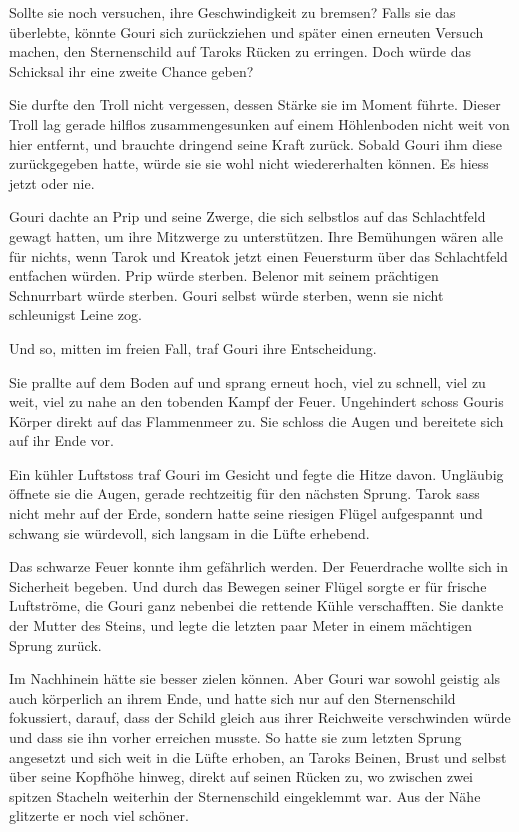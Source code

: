 Sollte sie noch versuchen, ihre Geschwindigkeit zu bremsen? Falls sie das überlebte, könnte Gouri sich zurückziehen und später einen erneuten Versuch machen, den Sternenschild auf Taroks Rücken zu erringen. Doch würde das Schicksal ihr eine zweite Chance geben?

Sie durfte den Troll nicht vergessen, dessen Stärke sie im Moment führte. Dieser Troll lag gerade hilflos zusammengesunken auf einem Höhlenboden nicht weit von hier entfernt, und brauchte dringend seine Kraft zurück. Sobald Gouri ihm diese zurückgegeben hatte, würde sie sie wohl nicht wiedererhalten können. Es hiess jetzt oder nie.

Gouri dachte an Prip und seine Zwerge, die sich selbstlos auf das Schlachtfeld gewagt hatten, um ihre Mitzwerge zu unterstützen. Ihre Bemühungen wären alle für nichts, wenn Tarok und Kreatok jetzt einen Feuersturm über das Schlachtfeld entfachen würden. Prip würde sterben. Belenor mit seinem prächtigen Schnurrbart würde sterben. Gouri selbst würde sterben, wenn sie nicht schleunigst Leine zog.

Und so, mitten im freien Fall, traf Gouri ihre Entscheidung.

Sie prallte auf dem Boden auf und sprang erneut hoch, viel zu schnell, viel zu weit, viel zu nahe an den tobenden Kampf der Feuer. Ungehindert schoss Gouris Körper direkt auf das Flammenmeer zu. Sie schloss die Augen und bereitete sich auf ihr Ende vor.

Ein kühler Luftstoss traf Gouri im Gesicht und fegte die Hitze davon. Ungläubig öffnete sie die Augen, gerade rechtzeitig für den nächsten Sprung. Tarok sass nicht mehr auf der Erde, sondern hatte seine riesigen Flügel aufgespannt und schwang sie würdevoll, sich langsam in die Lüfte erhebend.

Das schwarze Feuer konnte ihm gefährlich werden. Der Feuerdrache wollte sich in Sicherheit begeben. Und durch das Bewegen seiner Flügel sorgte er für frische Luftströme, die Gouri ganz nebenbei die rettende Kühle verschafften. Sie dankte der Mutter des Steins, und legte die letzten paar Meter in einem mächtigen Sprung zurück.

Im Nachhinein hätte sie besser zielen können. Aber Gouri war sowohl geistig als auch körperlich an ihrem Ende, und hatte sich nur auf den Sternenschild fokussiert, darauf, dass der Schild gleich aus ihrer Reichweite verschwinden würde und dass sie ihn vorher erreichen musste. So hatte sie zum letzten Sprung angesetzt und sich weit in die Lüfte erhoben, an Taroks Beinen, Brust und selbst über seine Kopfhöhe hinweg, direkt auf seinen Rücken zu, wo zwischen zwei spitzen Stacheln weiterhin der Sternenschild eingeklemmt war. Aus der Nähe glitzerte er noch viel schöner.

